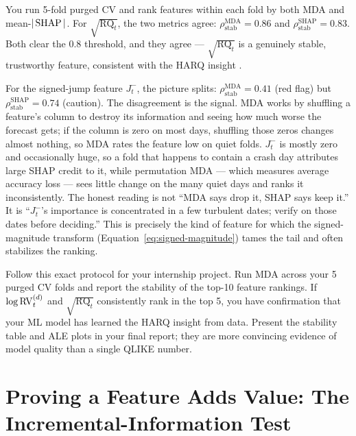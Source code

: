 \begin{workedexample}
You run 5-fold purged CV and rank features within each fold by both MDA and mean-$|\operatorname{SHAP}|$. For $\sqrt{\operatorname{RQ}_t}$, the two metrics agree: $\rho_{\text{stab}}^{\text{MDA}} = 0.86$ and $\rho_{\text{stab}}^{\text{SHAP}} = 0.83$. Both clear the $0.8$ threshold, and they agree --- $\sqrt{\operatorname{RQ}_t}$ is a genuinely stable, trustworthy feature, consistent with the HARQ insight \citep{BollerslevPattonQuaedvlieg2016HARQ}.

For the signed-jump feature $J_t^-$, the picture splits: $\rho_{\text{stab}}^{\text{MDA}} = 0.41$ (red flag) but $\rho_{\text{stab}}^{\text{SHAP}} = 0.74$ (caution). The disagreement is the signal. MDA works by shuffling a feature's column to destroy its information and seeing how much worse the forecast gets; if the column is zero on most days, shuffling those zeros changes almost nothing, so MDA rates the feature low on quiet folds. $J_t^-$ is mostly zero and occasionally huge, so a fold that happens to contain a crash day attributes large SHAP credit to it, while permutation MDA --- which measures average accuracy loss --- sees little change on the many quiet days and ranks it inconsistently. The honest reading is not ``MDA says drop it, SHAP says keep it.'' It is ``$J_t^-$'s importance is concentrated in a few turbulent dates; verify on those dates before deciding.'' This is precisely the kind of feature for which the signed-magnitude transform (Equation~\ref{eq:signed-magnitude}) tames the tail and often stabilizes the ranking.
\end{workedexample}


\begin{projectconnection}
Follow this exact protocol for your internship project. Run MDA across your 5 purged CV folds and report the stability of the top-10 feature rankings. If $\log \operatorname{RV}_t^{(d)}$ and $\sqrt{\operatorname{RQ}_t}$ consistently rank in the top 5, you have confirmation that your ML model has learned the HARQ insight from data. Present the stability table and ALE plots in your final report; they are more convincing evidence of model quality than a single QLIKE number.
\end{projectconnection}

\section{Proving a Feature Adds Value: The Incremental-Information Test}\label{sec:feat-incremental}

